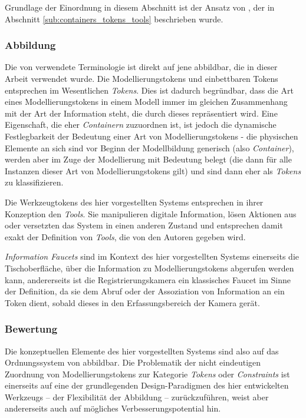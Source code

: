 Grundlage der Einordnung in diesem Abschnitt ist der Ansatz von \citet{Holmquist99}, der in Abschnitt \ref{sub:containers_tokens_tools} beschrieben wurde.

\subsubsection{Abbildung}

Die von \citeauthor{Holmquist99} verwendete Terminologie ist direkt auf jene abbildbar, die in dieser Arbeit verwendet wurde. Die Modellierungstokens und einbettbaren Tokens entsprechen im Wesentlichen \emph{Tokens}. Dies ist dadurch begründbar, dass die Art eines Modellierungstokens in einem Modell immer im gleichen Zusammenhang mit der Art der Information steht, die durch dieses repräsentiert wird. Eine Eigenschaft, die eher \emph{Containern} zuzuordnen ist, ist jedoch die dynamische Festlegbarkeit der Bedeutung einer Art von Modellierungstokens - die physischen Elemente an sich sind vor Beginn der Modellbildung generisch (also \emph{Container}), werden aber im Zuge der Modellierung mit Bedeutung belegt (die dann für alle Instanzen dieser Art von Modellierungstokens gilt) und sind dann eher als \emph{Tokens} zu klassifizieren. 

Die Werkzeugtokens des hier vorgestellten Systems entsprechen in ihrer Konzeption den \emph{Tools}. Sie manipulieren digitale Information, lösen Aktionen aus oder versetzten das System in einen anderen Zustand und entsprechen damit exakt der Definition von \emph{Tools}, die von den Autoren gegeben wird.

\emph{Information Faucets} sind im Kontext des hier vorgestellten Systems einerseits die Tischoberfläche, über die Information zu Modellierungstokens abgerufen werden kann, andererseits ist die Registrierungskamera ein klassisches Faucet im Sinne der Definition, da sie dem Abruf oder der Assoziation von Information an ein Token dient, sobald dieses in den Erfassungsbereich der Kamera gerät.

\subsubsection{Bewertung}

Die konzeptuellen Elemente des hier vorgestellten Systems sind also auf das Ordnungssystem von \citet{Holmquist99} abbildbar. Die Problematik der nicht eindeutigen Zuordnung von Modellierungstokens zur Kategorie \emph{Tokens} oder \emph{Constraints} ist einerseits auf eine der grundlegenden Design-Paradigmen des hier entwickelten Werkzeugs -- der Flexibilität der Abbildung -- zurückzuführen, weist aber andererseits auch auf mögliches Verbesserungspotential hin.

